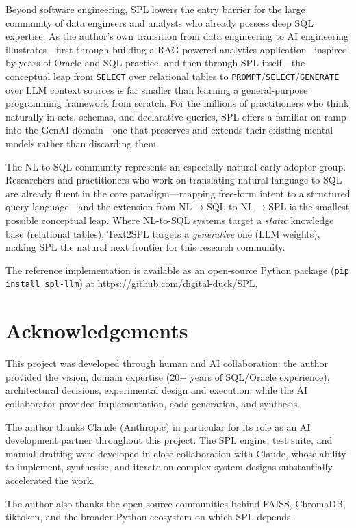 \documentclass[11pt,a4paper]{article}
\begin{document}
Beyond software engineering, SPL lowers the entry barrier for the large community of
data engineers and analysts who already possess deep SQL expertise.
As the author's own transition from data engineering to AI engineering illustrates---first
through building a RAG-powered analytics application~\citep{gong2024datacopilot} inspired
by years of Oracle and SQL practice, and then through SPL itself---the conceptual leap
from \texttt{SELECT} over relational tables to \texttt{PROMPT}/\texttt{SELECT}/\texttt{GENERATE}
over LLM context sources is far smaller than learning a general-purpose programming framework
from scratch.
For the millions of practitioners who think naturally in sets, schemas, and declarative queries,
SPL offers a familiar on-ramp into the GenAI domain---one that preserves and extends their
existing mental models rather than discarding them.

The NL-to-SQL community represents an especially natural early adopter group.
Researchers and practitioners who work on translating natural language to SQL
\citep{yu2018spider,yu2019sparc} are already fluent in the core paradigm---mapping
free-form intent to a structured query language---and the extension from
NL$\to$SQL to NL$\to$SPL is the smallest possible conceptual leap.
Where NL-to-SQL systems target a \emph{static} knowledge base (relational tables),
Text2SPL targets a \emph{generative} one (LLM weights), making SPL the natural
next frontier for this research community.

The reference implementation is available as an open-source Python package (\texttt{pip install spl-llm}) at \url{https://github.com/digital-duck/SPL}.


\section*{Acknowledgements}

This project was developed through human and AI collaboration: the author provided the vision, domain expertise (20+ years of SQL/Oracle experience), architectural decisions, experimental design and execution, while the AI collaborator provided implementation, code generation, and synthesis.

The author thanks Claude (Anthropic) in particular for its role as an AI development partner throughout
this project. The SPL engine, test suite, and manual drafting were developed
in close collaboration with Claude, whose ability to implement, synthesise, and iterate
on complex system designs substantially accelerated the work. 

The author also thanks the open-source communities behind FAISS, ChromaDB, tiktoken, and the
broader Python ecosystem on which SPL depends.



\end{document}

